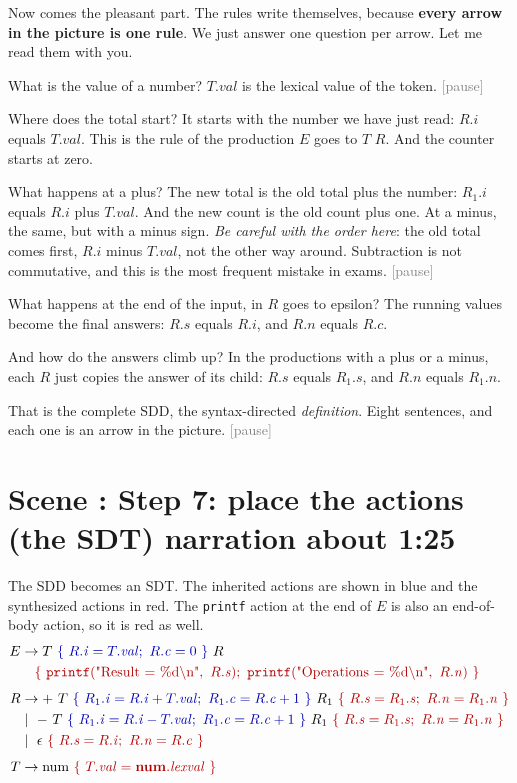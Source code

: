 \documentclass[11pt,a4paper]{article}
\newcommand{\at}[2]{\ensuremath{#1.\mathit{#2}}}
\newcommand{\inh}[1]{\textcolor{blue!70!black}{#1}}   %
\newcommand{\syn}[1]{\textcolor{red!70!black}{#1}}    %
\newcommand{\pause}{\textcolor{gray}{\textsf{[pause]}}}
\newcounter{scene}
\newcommand{\scene}[2]{\stepcounter{scene}\needspace{20\baselineskip}\section*{Scene \thescene: #1 \hfill {\normalfont\small #2}}}
\begin{document}
\begin{narration}
Now comes the pleasant part. The rules write themselves, because \textbf{every arrow in the picture is one rule}. We just answer one question per arrow. Let me read them with you.

What is the value of a number? $T.val$ is the lexical value of the token. \pause

Where does the total start? It starts with the number we have just read: $R.i$ equals $T.val$. This is the rule of the production $E$ goes to $T$ $R$. And the counter starts at zero.

What happens at a plus? The new total is the old total plus the number: $R_1.i$ equals $R.i$ plus $T.val$. And the new count is the old count plus one. At a minus, the same, but with a minus sign. \emph{Be careful with the order here}: the old total comes first, $R.i$ minus $T.val$, not the other way around. Subtraction is not commutative, and this is the most frequent mistake in exams. \pause

What happens at the end of the input, in $R$ goes to epsilon? The running values become the final answers: $R.s$ equals $R.i$, and $R.n$ equals $R.c$.

And how do the answers climb up? In the productions with a plus or a minus, each $R$ just copies the answer of its child: $R.s$ equals $R_1.s$, and $R.n$ equals $R_1.n$.

That is the complete SDD, the syntax-directed \emph{definition}. Eight sentences, and each one is an arrow in the picture. \pause
\end{narration}

\scene{Step 7: place the actions (the SDT)}{narration about 1:25}

\begin{onscreen}
The SDD becomes an SDT. The inherited actions are shown in blue and the synthesized actions in red. The \texttt{printf} action at the end of $E$ is also an end-of-body action, so it is red as well.
\[
\begin{aligned}
E &\to T\ \inh{\{\ \at{R}{i}=\at{T}{val};\ \at{R}{c}=0\ \}}\ R\\
  &\quad\syn{\{\ \texttt{printf}(\text{"Result = \%d\textbackslash n"},\ \at{R}{s});\ \texttt{printf}(\text{"Operations = \%d\textbackslash n"},\ \at{R}{n})\ \}}\\[4pt]
R &\to +\ T\ \inh{\{\ \at{R_1}{i}=\at{R}{i}+\at{T}{val};\ \at{R_1}{c}=\at{R}{c}+1\ \}}\ R_1\ \syn{\{\ \at{R}{s}=\at{R_1}{s};\ \at{R}{n}=\at{R_1}{n}\ \}}\\
  &\mid\ -\ T\ \inh{\{\ \at{R_1}{i}=\at{R}{i}-\at{T}{val};\ \at{R_1}{c}=\at{R}{c}+1\ \}}\ R_1\ \syn{\{\ \at{R}{s}=\at{R_1}{s};\ \at{R}{n}=\at{R_1}{n}\ \}}\\
  &\mid\ \epsilon\ \syn{\{\ \at{R}{s}=\at{R}{i};\ \at{R}{n}=\at{R}{c}\ \}}\\[4pt]
T &\to \text{num}\ \syn{\{\ \at{T}{val}=\at{\mathbf{num}}{lexval}\ \}}
\end{aligned}
\]
\end{onscreen}
\end{document}
